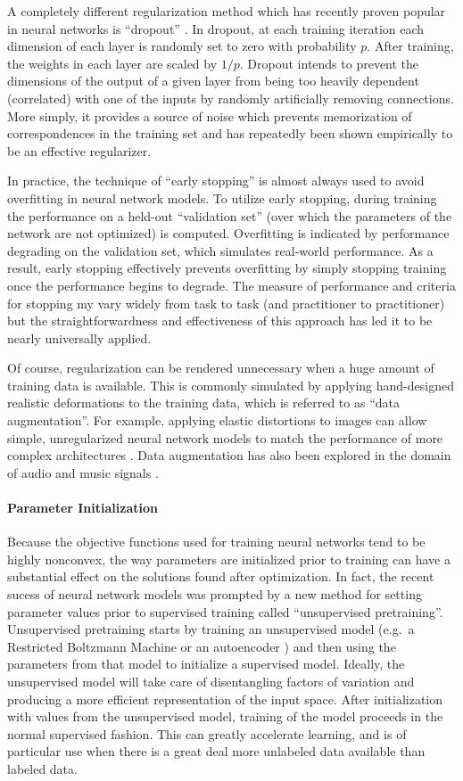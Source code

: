 A completely different regularization method which has recently proven popular in neural networks is ``dropout'' \cite{}.
In dropout, at each training iteration each dimension of each layer is randomly set to zero with probability $p$.
After training, the weights in each layer are scaled by $1/p$.
Dropout intends to prevent the dimensions of the output of a given layer from being too heavily dependent (correlated) with one of the inputs by randomly artificially removing connections.
More simply, it provides a source of noise which prevents memorization of correspondences in the training set and has repeatedly been shown empirically to be an effective regularizer.

In practice, the technique of ``early stopping'' is almost always used to avoid overfitting in neural network models.
To utilize early stopping, during training the performance on a held-out ``validation set'' (over which the parameters of the network are not optimized) is computed.
Overfitting is indicated by performance degrading on the validation set, which simulates real-world performance.
As a result, early stopping effectively prevents overfitting by simply stopping training once the performance begins to degrade.
The measure of performance and criteria for stopping my vary widely from task to task (and practitioner to practitioner) but the straightforwardness and effectiveness of this approach has led it to be nearly universally applied.

Of course, regularization can be rendered unnecessary when a huge amount of training data is available.
This is commonly simulated by applying hand-designed realistic deformations to the training data, which is referred to as ``data augmentation''.
For example, applying elastic distortions to images can allow simple, unregularized neural network models to match the performance of more complex architectures \cite{}.
Data augmentation has also been explored in the domain of audio and music signals \cite{}.

\paragraph{Parameter Initialization}

Because the objective functions used for training neural networks tend to be highly nonconvex, the way parameters are initialized prior to training can have a substantial effect on the solutions found after optimization.
In fact, the recent sucess of neural network models was prompted by a new method for setting parameter values prior to supervised training called ``unsupervised pretraining''.
Unsupervised pretraining starts by training an unsupervised model (e.g.\ a Restricted Boltzmann Machine \cite{} or an autoencoder \cite{}) and then using the parameters from that model to initialize a supervised model.
Ideally, the unsupervised model will take care of disentangling factors of variation and producing a more efficient representation of the input space.
After initialization with values from the unsupervised model, training of the model proceeds in the normal supervised fashion.
This can greatly accelerate learning, and is of particular use when there is a great deal more unlabeled data available than labeled data.

